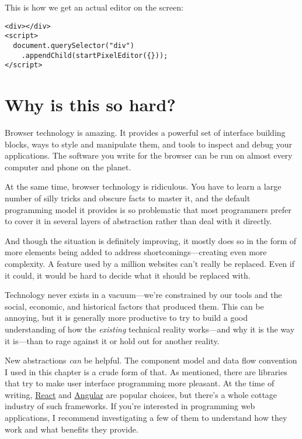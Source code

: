 This is how we get an actual editor on the screen:

\begin{lstlisting}
<div></div>
<script>
  document.querySelector("div")
    .appendChild(startPixelEditor({}));
</script>
\end{lstlisting}
\noindent

\section{Why is this so hard?}

Browser technology is amazing. It provides a powerful set of interface building blocks, ways to style and manipulate them, and tools to inspect and debug your applications. The software you write for the browser can be run on almost every computer and phone on the planet.

At the same time, browser technology is ridiculous. You have to learn a large number of silly tricks and obscure facts to master it, and the default programming model it provides is so problematic that most programmers prefer to cover it in several layers of abstraction rather than deal with it directly.

And though the situation is definitely improving, it mostly does so in the form of more elements being added to address shortcomings—creating even more complexity. A feature used by a million websites can't really be replaced. Even if it could, it would be hard to decide what it should be replaced with.

Technology never exists in a vacuum—we're constrained by our tools and the social, economic, and historical factors that produced them. This can be annoying, but it is generally more productive to try to build a good understanding of how the \emph{existing} technical reality works—and why it is the way it is—than to rage against it or hold out for another reality.

New abstractions \emph{can} be helpful. The component model and data
flow convention I used in this chapter is a crude form of that. As mentioned, there are libraries that try to make user interface programming more pleasant. At the time of writing, \href{https://reactjs.org/}{React} and \href{https://angular.io/}{Angular} are popular choices, but there's a whole cottage industry of such frameworks. If you're interested in programming web applications, I recommend investigating a few of them to understand how they work and what benefits they provide.

